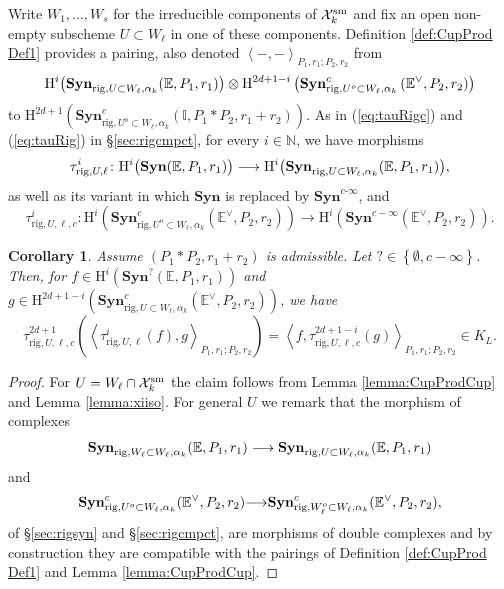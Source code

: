 \documentclass[asterisque,english]{smfart}
\newtheorem{cor}[theo]{Corollary}
\begin{document}
Write $W_1,\ldots,W_s$ for the irreducible components of $\mathcal{X}_k^{\rm sm}$ and fix an open non-empty subscheme $U\subset W_\ell$ in one of these components.  Definition \ref{def:CupProd Def1} provides a pairing, also denoted
$\left\langle -,-\right\rangle _{P_{1},r_{1};P_{2},r_{2}}$  from $$\mathrm{H}^i\bigl(\mathbf{Syn}_{{\rm rig},U\subset W_\ell, \alpha_k}(\mathbb{E},P_1,r_1)\bigr)
\otimes\mathrm{H}^{2d+1-i}\left( \mathbf{Syn}_{\mathrm{rig}
,U^{o}\subset W_\ell, \alpha_k}^{c}\left( \mathbb{E}^\vee,P_2,r_2\right)
\right) $$to $\mathrm{H}^{2d+1}\left( \mathbf{Syn}_{\mathrm{rig}
,U^{o}\subset W_\ell, \alpha_k}^{c}\left( \mathbb{I},P_{1}\ast P_{2},r_1+r_2\right)
\right)$. As in (\ref{eq:tauRigc}) and (\ref{eq:tauRig}) in \S \ref{sec:rigcmpct}, for every $i\in  \mathbb{N}$,   we have morphisms
$$
\tau_{{\rm rig},U,\ell}^i\colon \mathrm{H}^i\bigl(\mathbf{Syn}(\mathbb{E},P_1,r_1)\bigr) \longrightarrow \mathrm{H}^i\bigl(\mathbf{Syn}_{{\rm rig},U\subset W_\ell, \alpha_k}(\mathbb{E},P_1,r_1)\bigr),$$ as well as its variant in which $\mathbf{Syn}$ is
replaced by $\mathbf{Syn}^{c\text{-}\infty }$, and
$$\tau_{\mathrm{rig},U, \ell,c}^i\colon\mathrm{H}^{i}\left( \mathbf{Syn}_{\mathrm{rig}
,U^{o}\subset W_\ell, \alpha_k}^{c}\left( \mathbb{E}^\vee,P_2,r_2\right)
\right) \longrightarrow \mathrm{H}^{i}\left( \mathbf{Syn}^{c-\infty}\left( \mathbb{
E}^\vee,P_2,r_2\right) \right).$$
\begin{cor}\label{cor:compdual} Assume $\left( P_{1}\ast P_{2},r_{1}+r_{2}\right) $ is admissible. Let $?\in \left\{ \emptyset ,c-\infty
\right\} $. Then, for  $f\in \mathrm{H}^{i}\left( \mathbf{Syn}^{?}\left( \mathbb{E}
,P_{1},r_{1}\right) \right) $ and  $g\in \mathrm{H}^{2d+1-i}\left( \mathbf{Syn}_{\mathrm{rig}
,U\subset W_\ell, \alpha_k}^c\left( \mathbb{E}^\vee,P_2,r_2\right)
\right)$, we have 
$$
\tau_{\mathrm{rig},U,\ell,c}^{2d+1}\left(\left\langle \tau _{\mathrm{rig},U,\ell}^i\left( f\right) ,g\right\rangle
_{P_{1},r_{1};P_{2},r_{2}}\right)=\left\langle f,\tau _{\mathrm{rig},U,\ell,c}^{2d+1-i}\left(
g\right) \right\rangle _{P_{1},r_{1};P_{2},r_{2}}\in K_L.
$$
\end{cor} 
\begin{proof} 
For $U=W_\ell\cap \mathcal{X}_k^{\rm sm}$ the claim follows from Lemma \ref{lemma:CupProdCup} and Lemma \ref{lemma:xiiso}. For general $U$ we remark that the morphism of complexes 
$$\mathbf{Syn}_{{\rm rig},W_\ell\subset W_\ell, \alpha_k}(\mathbb{E},P_1,r_1) \longrightarrow\mathbf{Syn}_{{\rm rig},U\subset W_\ell, \alpha_k}(\mathbb{E},P_1,r_1)$$and $$\mathbf{Syn}_{{\rm rig},U^o\subset W_\ell, \alpha_k}^c(\mathbb{E}^\vee,P_2,r_2) {\longrightarrow} \mathbf{Syn}_{{\rm rig},W_\ell^o\subset W_\ell, \alpha_k}^c(\mathbb{E}^\vee,P_2,r_2),$$of \S \ref{sec:rigsyn} and \S \ref{sec:rigcmpct}, are morphisms of double complexes and by construction they are compatible with the pairings of Definition \ref{def:CupProd Def1} and Lemma \ref{lemma:CupProdCup}.
\end{proof}
\end{document}
